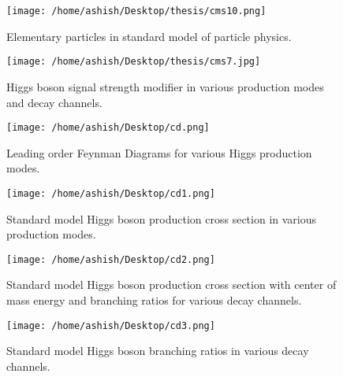 \documentclass[final,3p]{CSP}
\begin{document}


\begin{figure}
  \centering
   \texttt{[image: /home/ashish/Desktop/thesis/cms10.png]}
  \caption{Elementary particles in standard model of particle physics.}
   \label{figure 9}
\end{figure}

\begin{figure}
  \centering
   \texttt{[image: /home/ashish/Desktop/thesis/cms7.jpg]}
  \caption{Higgs boson signal strength modifier in various production modes and decay channels.}
   \label{figure 10}
\end{figure}



\begin{figure}
  \centering
   \texttt{[image: /home/ashish/Desktop/cd.png]}
  \caption{Leading order Feynman Diagrams for various Higgs production modes.}
   \label{figure 12}
\end{figure}


\begin{figure}
  \centering
   \texttt{[image: /home/ashish/Desktop/cd1.png]}
  \caption{Standard model Higgs boson production cross section in various production modes.}
   \label{figure 13}
\end{figure}

\begin{figure}
  \centering
   \texttt{[image: /home/ashish/Desktop/cd2.png]}
  \caption{Standard model Higgs boson production cross section with center of mass energy and branching ratios for various decay channels.}
   \label{figure 14}
\end{figure}

\begin{figure}
  \centering
   \texttt{[image: /home/ashish/Desktop/cd3.png]}
  \caption{Standard model Higgs boson branching ratios in various decay channels.}
   \label{figure 15}
\end{figure}
\end{document}
